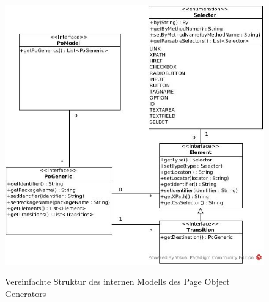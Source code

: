 \begin{figure}[htb]
  \centering  
  \includegraphics[scale=0.46]{img/SimpleModel.jpg}\\
  \caption{Vereinfachte Struktur des internen Modells des Page Object Generators}
  \label{fig:simple_model}
\end{figure}

